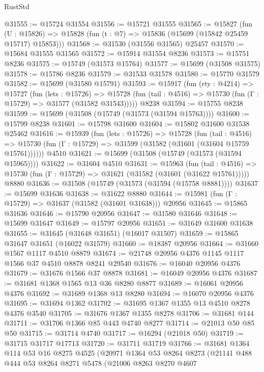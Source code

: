 \begin{lexlean}{RustStd}
\begin{coremodule}
@31555 := @15724 @31554
@31556 := @15721 @31555
@31565 := @15827
    (fun (U : @15826) => @15828 (fun (t : @7) => @15836 (@15699 (@15842 @25459 @15717) @15853)))
@31568 := @31530 (@31556 @31565) @25457
@31570 := @15684 @31555 @31565
@31572 := @15914 @31554 @8236
@31573 := @15751 @8236
@31575 := @15749 (@31573 @15764)
@31577 := @15699 (@31508 @31575)
@31578 := @15786 @8236
@31579 := @31533 @31578
@31580 := @15770 @31579
@31582 := @15699 (@31580 @15791)
@31593 := @15917
    (fun (rty : @4214) =>
    @15727
      (fun (lets : @15726) =>
      @15728 (fun (tail : @4516) => @15730 (fun (Γ : @15729) => @31577 (@31582 @31543)))))
    @8238
@31594 := @15755 @8238
@31599 := @15699 (@31508 (@15749 (@31573 (@31594 @15763))))
@31600 := @15799 @8238
@31601 := @15798 @31600
@31604 := @15802 @31600 @31538 @25462
@31616 := @15939
    (fun (lets : @15726) =>
    @15728
      (fun (tail : @4516) =>
      @15730 (fun (Γ : @15729) => @31599 (@31582 (@31601 (@31604 @15759 @15761))))))
    @4510
@31621 := @15699 (@31508 (@15749 (@31573 (@31594 @15965))))
@31622 := @31604 @4510
@31631 := @15963
    (fun (tail : @4516) => @15730 (fun (Γ : @15729) => @31621 (@31582 (@31601 (@31622 @15761)))))
    @8880
@31636 := @31508 (@15749 (@31573 (@31594 (@15758 @8881))))
@31637 := @15699 @31636
@31638 := @31622 @8880
@31644 := @15981 (fun (Γ : @15729) => @31637 (@31582 (@31601 @31638))) @20956
@31645 := @15865 @31636
@31646 := @15790 @20956
@31647 := @31580 @31646
@31648 := @15699 @31647
@31649 := @15797 @20956
@31651 := @31649 @31600 @31638
@31655 := @31645 (@31648 @31651) (@16017 @31507)
@31659 := @15865 @31647 @31651 (@16022 @31579)
@31660 := @18387 @20956
@31664 := @31660 @1567 @1117 @4510 @8879
@31674 := @21748 @20956 @4376 @1145 @1117 @1566 @37 @4510 @8878 @8241 @29540
@31676 := @16040 @20956 @4376
@31679 := @31676 @1566 @37 @8878
@31681 := @16049 @20956 @4376
@31687 := @31681 @1368 @1565 @13 @36 @8280 @8877
@31689 := @16061 @20956 @4376
@31692 := @31689 @1368 @13 @8280
@31694 := @16070 @20956 @4376
@31695 := @31694 @1362
@31702 := @31695 @1367 @1355 @13 @4510 @8278 @4376 @3540
@31705 := @31676 @1367 @1355 @8278
@31706 := @31681 @144
@31711 := @31706 @1366 @85 @443 @4740 @8277
@31714 := @21013 @50 @85 @50
@31715 := @31714 @4740
@31717 := @16294 (@21018 @50)
@31719 := @31715 @31717 @17713
@31720 := @31711 @31719
@31766 := @31681
    @1364
    @114
    @53
    @16
    @8275
    @4525
    (@20971
      @1364
      @53
      @8264
      @8273
      (@21141
        @488
        @444
        @53
        @8264
        @8271
        @5478
        (@21006
          @8263
          @8270
          @4607

\end{coremodule}
\end{lexlean}
